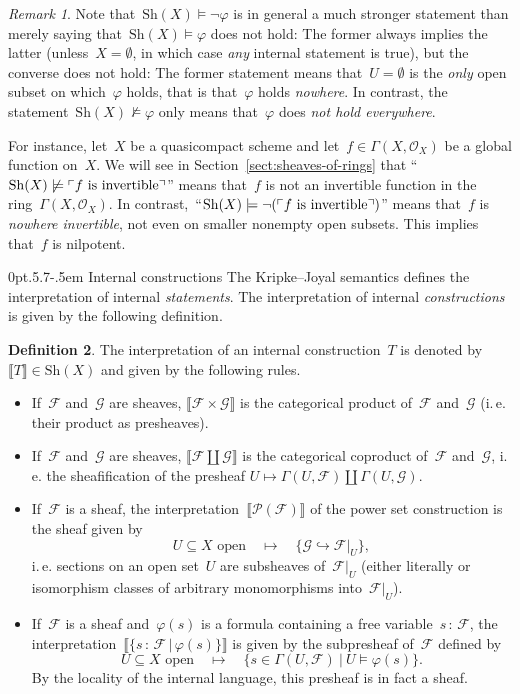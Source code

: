\documentclass[10pt,reqno,a4paper]{amsbook}
\makeatletter
\theoremstyle{definition}
\newtheorem{defn}{Definition}[section]
\theoremstyle{plain}
\theoremstyle{remark}
\newtheorem{rem}[defn]{Remark}
\newcommand{\F}{\mathcal{F}}
\renewcommand{\G}{\mathcal{G}}
\renewcommand{\O}{\mathcal{O}}
\renewcommand{\P}{\mathcal{P}}
\newcommand{\Sh}{\mathrm{Sh}}
\newcommand{\?}{\,{:}\,}
\renewcommand{\_}{\mathpunct{.}\,}
\newcommand{\speak}[1]{\ulcorner\text{\textnormal{#1}}\urcorner}
\newcommand{\brak}[1]{{\llbracket{#1}\rrbracket}}
\newcommand{\ie}{i.\,e.\@\xspace}
\def\subsection{\@startsection{subsection}{2}%
  {0pt}{.5\linespacing\@plus.7\linespacing}{-.5em}%
  {\normalfont\bfseries}}
\makeatother
\begin{document}
\begin{rem}Note that~$\Sh(X) \models \neg\varphi$ is in general a much stronger
statement than merely saying that~$\Sh(X) \models \varphi$ does not hold:
The former always implies the latter (unless~$X = \emptyset$, in which case
\emph{any} internal statement is true), but the converse does not hold: The
former statement means that~$U = \emptyset$ is the \emph{only} open subset on
which~$\varphi$ holds, that is that~$\varphi$ holds \emph{nowhere}. In
contrast, the statement~$\Sh(X) \not\models \varphi$ only means that~$\varphi$
does \emph{not hold everywhere}.

For instance, let~$X$ be a quasicompact scheme and let~$f \in
\Gamma(X,\O_X)$ be a global function on~$X$. We will see in
Section~\ref{sect:sheaves-of-rings} that ``$\Sh(X) \not\models \speak{$f$ is
invertible}$'' means that~$f$ is not an invertible function in the
ring~$\Gamma(X,\O_X)$. In contrast,~``$\Sh(X) \models \neg(\speak{$f$ is
invertible})$'' means that~$f$ is \emph{nowhere invertible}, not even on
smaller non\-empty open subsets. This implies that~$f$ is nilpotent.
\end{rem}


\subsection{Internal constructions}
\label{sect:internal-constructions}
The Kripke--Joyal semantics defines the
interpretation of internal \emph{statements}. The interpretation of internal
\emph{constructions} is given by the following definition.

\begin{defn}\label{defn:interpretation-internal-constructions}
The interpretation of an internal construction~$T$
is denoted by~$\brak{T} \in \Sh(X)$ and given by the following rules.
\begin{itemize}\item If~$\F$ and~$\G$ are sheaves, $\brak{\F \times \G}$ is the
categorical product of~$\F$ and~$\G$ (\ie their product as presheaves).
\item If~$\F$ and~$\G$ are sheaves, $\brak{\F \amalg \G}$ is the categorical
coproduct of~$\F$ and~$\G$, \ie the sheafification of the presheaf
$U \mapsto \Gamma(U,\F) \amalg \Gamma(U,\G)$.
\item If~$\F$ is a sheaf, the interpretation~$\brak{\P(\F)}$ of the power set
construction is the sheaf given by
\[ \text{$U \subseteq X$ open} \quad\longmapsto\quad \{ \G \hookrightarrow \F|_U \}, \]
\ie sections on an open set~$U$ are subsheaves of~$\F|_U$ (either literally
or isomorphism classes of arbitrary monomorphisms into~$\F|_U$).
\item If~$\F$ is a sheaf and~$\varphi(s)$ is a formula containing a free
variable~$s\?\F$, the interpretation~$\brak{\{s\?\F\,|\,\varphi(s)\}}$ is given
by the subpresheaf of~$\F$ defined by
\[ \text{$U \subseteq X$ open} \quad\longmapsto\quad \{ s \in \Gamma(U,\F) \ |\
  U \models \varphi(s) \}. \]
By the locality of the internal language, this presheaf is in fact a
sheaf.
\end{itemize}
\end{defn}
\end{document}
